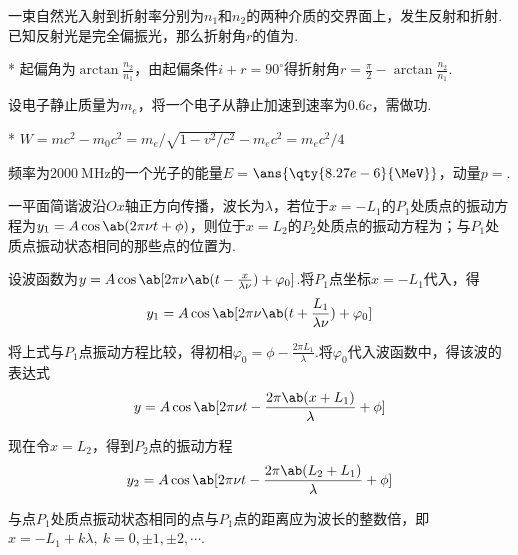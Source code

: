 \begin{problem}[起偏角][3]
    一束自然光入射到折射率分别为$n_1$和$n_2$的两种介质的交界面上，发生反射和折射.已知反射光是完全偏振光，那么折射角$r$的值为.
\end{problem}
\begin{solution}*
    起偏角为$\arctan{\frac{n_2}{n_1}}$，由起偏条件$i+r=90^{\circ}$得折射角$r=\frac{\pi}{2}-\arctan{\frac{n_2}{n_1}}$.
\end{solution}

\begin{problem}[相对论能动量关系][3]
    设电子静止质量为$m_e$，将一个电子从静止加速到速率为$0.6c$，需做功.
\end{problem}
\begin{solution}*
    $W=mc^2-m_0c^2=m_e/\sqrt{1-v^2/c^2}-m_ec^2=m_ec^2/4$
\end{solution}

\begin{problem}[光子][3]
    频率为$\qty{2000}{\MHz}$的一个光子的能量$E=$$\ans{\qty{8.27e-6}{\MeV}}$，动量$p=$.
\end{problem}

\begin{problem}[平面简谐波的波函数][4]
    一平面简谐波沿$Ox$轴正方向传播，波长为$\lambda$，若位于$x=-L_1$的$P_1$处质点的振动方程为$y_1=A\cos\ab(2\pi\nu t+\phi)$，则位于$x=L_2$的$P_2$处质点的振动方程为；与$P_1$处质点振动状态相同的那些点的位置为.
\end{problem}
\begin{solution}
    设波函数为$y=A\cos\ab[2\pi\nu\ab(t-\frac{x}{\lambda\nu})+\varphi_0]$.将$P_1$点坐标$x=-L_1$代入，得
    \[y_1=A\cos\ab[2\pi\nu\ab(t+\frac{L_1}{\lambda\nu})+\varphi_0]\]

    将上式与$P_1$点振动方程比较，得初相$\varphi_0=\phi-\frac{2\pi L_1}{\lambda}$.将$\varphi_0$代入波函数中，得该波的表达式
    \[y=A\cos\ab[2\pi\nu t-\frac{2\pi\ab(x+L_1)}{\lambda}+\phi]\]

    现在令$x=L_2$，得到$P_2$点的振动方程
    \[y_2=A\cos\ab[2\pi\nu t-\frac{2\pi\ab(L_2+L_1)}{\lambda}+\phi]\]

    与点$P_1$处质点振动状态相同的点与$P_1$点的距离应为波长的整数倍，即$x=-L_1+k\lambda,\ k=0,\pm 1,\pm 2,\cdots$.
\end{solution}

